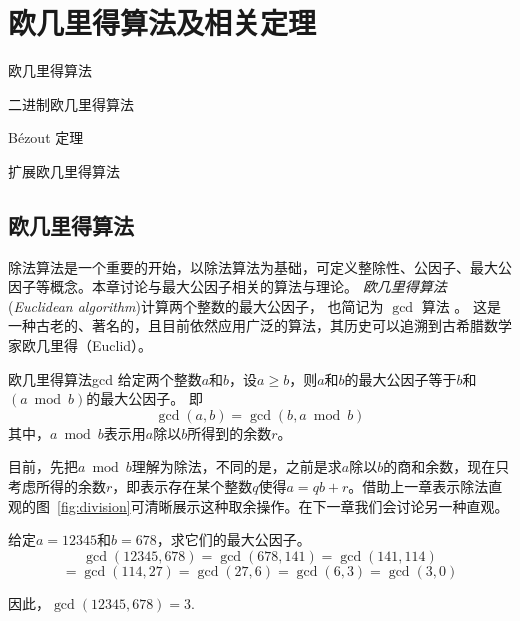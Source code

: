 
\chapter{欧几里得算法及相关定理}
\label{chap:euclid} 
\begin{introduction}
  \item 欧几里得算法
  \item 二进制欧几里得算法
  \item B\'{e}zout 定理
  \item 扩展欧几里得算法
\end{introduction}

\section{欧几里得算法}
\label{sec:gcd}
除法算法是一个重要的开始，以除法算法为基础，可定义整除性、公因子、最大公因子等概念。本章讨论与最大公因子相关的算法与理论。
\emph{欧几里得算法} (\emph{Euclidean algorithm})计算两个整数的最大公因子，
也简记为 $\gcd$ 算法  。
这是一种古老的、著名的，且目前依然应用广泛的算法，其历史可以追溯到古希腊数学家欧几里得（Euclid）。

\begin{theorem}{欧几里得算法}{gcd}
给定两个整数$a$和$b$，设$a \geq b$，则$a$和$b$的最大公因子等于$b$和$(a \bmod b)$的最大公因子。
即
\[\gcd(a, b) = \gcd(b, a \bmod b)\]
其中，$a \bmod b$表示用$a$除以$b$所得到的余数$r$。
\end{theorem}
目前，先把$a \bmod b$理解为除法，不同的是，之前是求$a$除以$b$的商和余数，现在只考虑所得的余数$r$，即表示存在某个整数$q$使得$a = qb + r$。借助上一章表示除法直观的图~\ref{fig:division}可清晰展示这种取余操作。在下一章我们会讨论另一种直观。

\begin{example}
\label{exm:gcd1}
	给定$a = 12345$和$b = 678$，求它们的最大公因子。 
	\[\gcd(12345, 678) = \gcd(678, 141) = \gcd(141,114)\]
	\[= \gcd(114, 27) = \gcd(27, 6) = \gcd(6, 3) = \gcd(3, 0) \]
	
	因此，$\gcd(12345, 678) = 3$.
\end{example}

